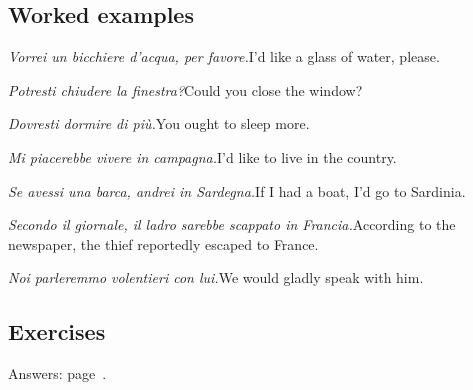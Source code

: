 \documentclass[11pt,a4paper,twoside,openright]{book}
\begin{document}
\subsection*{Worked examples}
\begin{examples}
\item\relax \textit{Vorrei un bicchiere d'acqua, per favore.}\newline I'd like a glass of water, please.
\item\relax \textit{Potresti chiudere la finestra?}\newline Could you close the window?
\item\relax \textit{Dovresti dormire di più.}\newline You ought to sleep more.
\item\relax \textit{Mi piacerebbe vivere in campagna.}\newline I'd like to live in the country.
\item\relax \textit{Se avessi una barca, andrei in Sardegna.}\newline If I had a boat, I'd go to Sardinia.
\item\relax \textit{Secondo il giornale, il ladro sarebbe scappato in Francia.}\newline According to the newspaper, the thief reportedly escaped to France.
\item\relax \textit{Noi parleremmo volentieri con lui.}\newline We would gladly speak with him.
\end{examples}

\subsection*{Exercises}\label{les:condizionale-presente:exercises}
{\color{muted}\small Answers: page~\pageref{ans:condizionale-presente}.}
\end{document}
